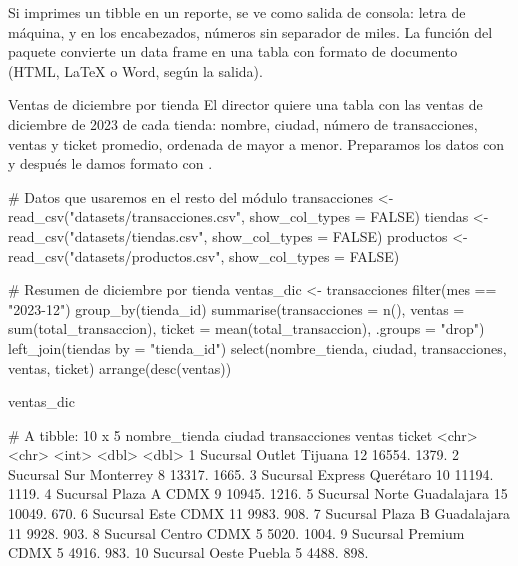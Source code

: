 Si imprimes un tibble en un reporte, se ve como salida de consola: letra de
máquina,  y  en los encabezados, números sin
separador de miles. La función  del paquete 
convierte un data frame en una tabla con formato de documento (HTML, LaTeX o
Word, según la salida).

\begin{ejemplo}{Ventas de diciembre por tienda}
El director quiere una tabla con las ventas de diciembre de 2023 de cada
tienda: nombre, ciudad, número de transacciones, ventas y ticket promedio,
ordenada de mayor a menor. Preparamos los datos con  y
después le damos formato con .
\end{ejemplo}

\begin{rcode}
# Datos que usaremos en el resto del módulo
transacciones <- read_csv("datasets/transacciones.csv",
                          show_col_types = FALSE)
tiendas   <- read_csv("datasets/tiendas.csv", show_col_types = FALSE)
productos <- read_csv("datasets/productos.csv", show_col_types = FALSE)

# Resumen de diciembre por tienda
ventas_dic <- transacciones %
  filter(mes == "2023-12") %
  group_by(tienda_id) %
  summarise(transacciones = n(),
            ventas = sum(total_transaccion),
            ticket = mean(total_transaccion), .groups = "drop") %
  left_join(tiendas %
            by = "tienda_id") %
  select(nombre_tienda, ciudad, transacciones, ventas, ticket) %
  arrange(desc(ventas))

ventas_dic
\end{rcode}
\begin{rsalida}
# A tibble: 10 x 5
   nombre_tienda    ciudad      transacciones ventas ticket
   <chr>            <chr>               <int>  <dbl>  <dbl>
 1 Sucursal Outlet  Tijuana                12 16554.  1379.
 2 Sucursal Sur     Monterrey               8 13317.  1665.
 3 Sucursal Express Querétaro              10 11194.  1119.
 4 Sucursal Plaza A CDMX                    9 10945.  1216.
 5 Sucursal Norte   Guadalajara            15 10049.   670.
 6 Sucursal Este    CDMX                   11  9983.   908.
 7 Sucursal Plaza B Guadalajara            11  9928.   903.
 8 Sucursal Centro  CDMX                    5  5020.  1004.
 9 Sucursal Premium CDMX                    5  4916.   983.
10 Sucursal Oeste   Puebla                  5  4488.   898.
\end{rsalida}

